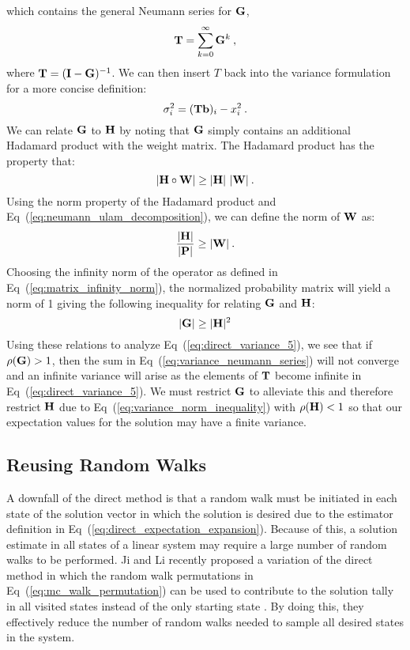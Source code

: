 which contains the general Neumann series for $\mathbf{G}$,
\begin{equation}
  \mathbf{T} = \sum_{k=0}^{\infty} \mathbf{G}^k\:,
  \label{eq:variance_neumann_series}
\end{equation}
where $\mathbf{T} = (\mathbf{I}-\mathbf{G})^{-1}$. We can then insert $T$ back
into the variance formulation for a more concise definition:
\begin{equation}
  \sigma^2_i = (\mathbf{T}\mathbf{b})_i - x_i^2\:.
  \label{eq:direct_variance_5}
\end{equation}
We can relate $\mathbf{G}$ to $\mathbf{H}$ by noting that $\mathbf{G}$ simply
contains an additional Hadamard product with the weight matrix. The
Hadamard product has the property that:
\begin{equation}
  |\mathbf{H} \circ \mathbf{W}| \geq |\mathbf{H}|\ |\mathbf{W}|\:.
  \label{eq:hadamard_inequality}
\end{equation}
Using the norm property of the Hadamard product and
Eq~(\ref{eq:neumann_ulam_decomposition}), we can define the norm of
$\mathbf{W}$ as:
\begin{equation}
  \frac{|\mathbf{H}|}{|\mathbf{P}|} \geq |\mathbf{W}|\:.
  \label{eq:weight_norm}
\end{equation}
Choosing the infinity norm of the operator as defined in
Eq~(\ref{eq:matrix_infinity_norm}), the normalized probability matrix
will yield a norm of 1 giving the following inequality for relating
$\mathbf{G}$ and $\mathbf{H}$:
\begin{equation}
  |\mathbf{G}| \geq |\mathbf{H}|^2
  \label{eq:variance_norm_inequality}
\end{equation}
Using these relations to analyze Eq~(\ref{eq:direct_variance_5}), we
see that if $\rho(\mathbf{G}) > 1$, then the sum in
Eq~(\ref{eq:variance_neumann_series}) will not converge and an
infinite variance will arise as the elements of $\mathbf{T}$ become
infinite in Eq~(\ref{eq:direct_variance_5}). We must restrict $\mathbf{G}$
to alleviate this and therefore restrict $\mathbf{H}$ due to
Eq~(\ref{eq:variance_norm_inequality}) with $\rho(\mathbf{H}) < 1$ so that
our expectation values for the solution may have a finite variance.

\subsection{Reusing Random Walks}
\label{subsec:reusing_random_walks}
A downfall of the direct method is that a random walk must be
initiated in each state of the solution vector in which the solution
is desired due to the estimator definition in
Eq~(\ref{eq:direct_expectation_expansion}). Because of this, a
solution estimate in all states of a linear system may require a
large number of random walks to be performed. Ji and Li recently
proposed a variation of the direct method in which the random walk
permutations in Eq~(\ref{eq:mc_walk_permutation}) can be used to
contribute to the solution tally in all visited states instead of the
only starting state \citep{ji_reusing_2012}. By doing this, they
effectively reduce the number of random walks needed to sample all
desired states in the system.

